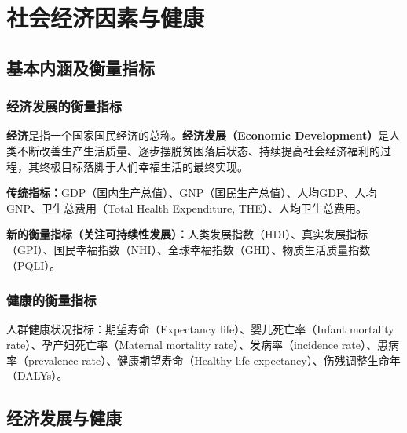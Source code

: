 \chapter{社会经济因素与健康}
\setcounter{chapter}{4}

\section{基本内涵及衡量指标}

\subsection{经济发展的衡量指标}

\begin{defbox}
\textbf{经济}是指一个国家国民经济的总称。\textbf{经济发展（Economic Development）}是人类不断改善生产生活质量、逐步摆脱贫困落后状态、持续提高社会经济福利的过程，其终极目标落脚于人们幸福生活的最终实现。

\textbf{传统指标：}GDP（国内生产总值）、GNP（国民生产总值）、人均GDP、人均GNP、卫生总费用（Total Health Expenditure, THE）、人均卫生总费用。

\textbf{新的衡量指标（关注可持续性发展）：}人类发展指数（HDI）、真实发展指标（GPI）、国民幸福指数（NHI）、全球幸福指数（GHI）、物质生活质量指数（PQLI）。
\end{defbox}

\subsection{健康的衡量指标}

\begin{defbox}
人群健康状况指标：期望寿命（Expectancy life）、婴儿死亡率（Infant mortality rate）、孕产妇死亡率（Maternal mortality rate）、发病率（incidence rate）、患病率（prevalence rate）、健康期望寿命（Healthy life expectancy）、伤残调整生命年（DALYs）。
\end{defbox}

\section{经济发展与健康}

